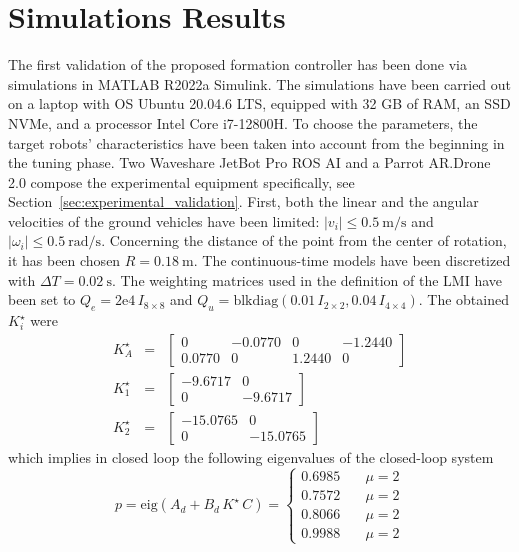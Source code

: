 \documentclass{ifacconf}
\begin{document}
\section{Simulations Results}
\label{sec:simulation_results}
The first validation of the proposed formation 
controller has been done via simulations in MATLAB R2022a Simulink.
The simulations have been carried out on a laptop with OS Ubuntu 20.04.6 LTS, 
equipped with 32 GB of RAM, an SSD NVMe, and a processor Intel Core i7-12800H.
To choose the parameters, the target robots' characteristics 
have been taken into account from the beginning 
in the tuning phase.
Two Waveshare JetBot Pro ROS AI and a Parrot AR.Drone 2.0 
compose the experimental equipment specifically, 
see Section~\ref{sec:experimental_validation}.
First, both the linear and the angular velocities 
of the ground vehicles have been limited: 
$\left\lvert v_i \right\rvert \leq \SI{0.5}{\meter\per\second}$ and 
$\left\lvert \omega_i\right\rvert \leq \SI{0.5}{\radian\per\second}$.
Concerning the distance of the point from the center of rotation, 
it has been chosen $R = \SI{0.18}{\meter}$.
The continuous-time models have been 
discretized with
$\Delta T = \SI{0.02}{\second}$.
The weighting matrices used in the definition 
of the LMI have been set to 
$Q_e = 2\mathrm{e}4 \, I_{8 \times 8}$ and 
$Q_u =\text{blkdiag}(0.01 \, I_{2\times2}, 0.04 \, I_{4\times4})$.
The obtained $K^\star_i$ were 
\begin{eqnarray}
    K^\star_A &=& \begin{bmatrix}
        0  &  -0.0770    &     0  &  -1.2440 \\
        0.0770 &     0       & 1.2440 &      0
    \end{bmatrix}\\
    K^\star_1 &=& \begin{bmatrix}
        -9.6717 & 0 \\
         0   & -9.6717
    \end{bmatrix}\\
    K^\star_2 &=& \begin{bmatrix}
        -15.0765 & 0 \\
         0   & -15.0765
    \end{bmatrix}
\end{eqnarray}
which implies in closed loop the following 
eigenvalues of the closed-loop system
\begin{equation}
    p = \text{eig}(A_d + B_d \, K^\star \, C) = 
    \begin{cases}
        0.6985 \quad & \mu = 2\\
        0.7572 \quad & \mu = 2\\
        0.8066 \quad & \mu = 2\\
        0.9988 \quad  &   \mu = 2
    \end{cases}
\end{equation}
\end{document}
